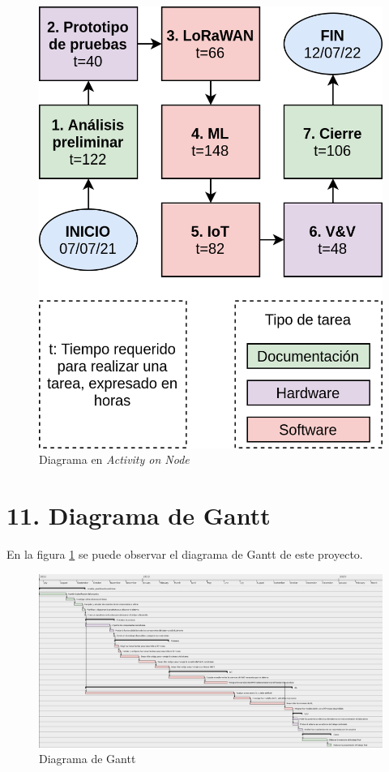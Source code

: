 \documentclass[
11pt, %
]{plan}
\begin{document}
\begin{figure}[htpb]
\centering
\includegraphics[width=.8\textwidth]{./fig/AoN.png}
\caption{Diagrama en \textit{Activity on Node}}
\label{fig:AoN}
\end{figure}

\section{11. Diagrama de Gantt}
\label{sec:gantt}

En la figura \ref{sec:gantt} se puede observar el diagrama de Gantt de este proyecto.

\begin{landscape}
\begin{figure}[htpb]
\centering
\includegraphics[height=.8\textheight]{./fig/gantt.png}
\caption{Diagrama de Gantt}
\label{fig:diagGantt}
\end{figure}

\end{landscape}
\end{document}
